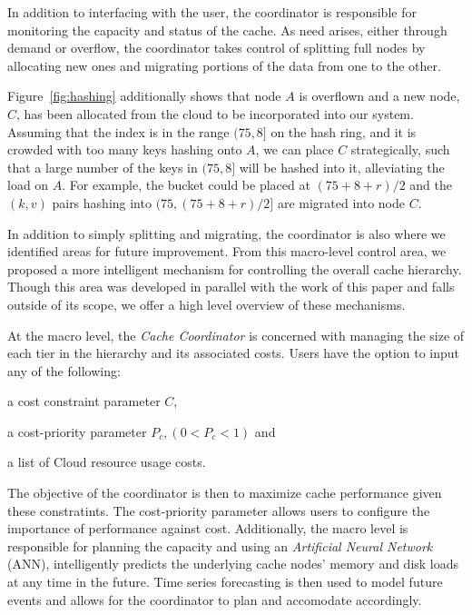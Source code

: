 In addition to interfacing with the user, the coordinator is responsible for
monitoring the capacity and status of the cache. As need arises, either through
demand or overflow, the coordinator takes control of splitting full nodes by
allocating new ones and migrating portions of the data from one to the other.

Figure~\ref{fig:hashing} additionally shows that node $A$ is overflown and a
new node, $C$, has been allocated from the cloud to be incorporated into our
system. Assuming that the index is in the range $(75,8]$ on the hash ring, and
it is crowded with too many keys hashing onto $A$, we can place $C$
strategically, such that a large number of the keys in $(75,8]$ will be hashed
into it, alleviating the load on $A$. For example, the bucket could be placed
at $(75 + 8 + r)/2$ and the $(k,v)$ pairs hashing into $(75, (75 + 8 + r)/2]$
are migrated into node $C$.

In addition to simply splitting and migrating, the coordinator is also where we
identified areas for future improvement\cite{chiu_ijngc11}. From this
macro-level control area, we proposed a more intelligent mechanism for
controlling the overall cache hierarchy. Though this area was developed in
parallel with the work of this paper and falls outside of its scope, we offer a
high level overview of these mechanisms.

At the macro level, the \emph{Cache Coordinator} is concerned with managing the
size of each tier in the hierarchy and its associated costs. Users have the
option to input any of the following:
\begin{inparaenum}[(1)]
  \item a cost constraint parameter $C$,
  \item a cost-priority parameter $P_c, (0 < P_c < 1)$ and
  \item a list of Cloud resource usage costs.
\end{inparaenum}
The objective of the coordinator is then to maximize cache performance given
these constratints. The cost-priority parameter allows users to configure the
importance of performance against cost. Additionally, the macro level is
responsible for planning the capacity and using an \emph{Artificial Neural
Network} (ANN), intelligently predicts the underlying cache nodes' memory and
disk loads at any time in the future. Time series forecasting is then used to
model future events and allows for the coordinator to plan and accomodate
accordingly.

